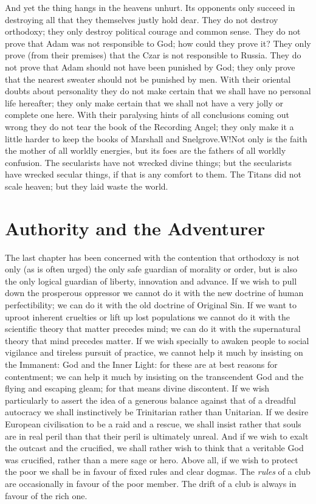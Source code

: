 \documentclass{book}
\begin{document}
And yet the thing hangs in the heavens unhurt. Its opponents only succeed in destroying all that they themselves justly hold dear. They do not destroy orthodoxy; they only destroy political courage and common sense. They do not prove that Adam was not responsible to God; how could they prove it? They only prove (from their premises) that the Czar is not responsible to Russia. They do not prove that Adam should not have been punished by God; they only prove that the nearest sweater should not be punished by men. With their oriental doubts about personality they do not make certain that we shall have no personal life hereafter; they only make certain that we shall not have a very jolly or complete one here. With their paralysing hints of all conclusions coming out wrong they do not tear the book of the Recording Angel; they only make it a little harder to keep the books of Marshall and Snelgrove.W!Not only is the faith the mother of all worldly energies, but its foes are the fathers of all worldly confusion. The secularists have not wrecked divine things; but the secularists have wrecked secular things, if that is any comfort to them. The Titans did not scale heaven; but they laid waste the world.

\chapter{Authority and the Adventurer}
\label{chapter-8}
The last chapter has been concerned with the contention that orthodoxy is not only (as is often urged) the only safe guardian of morality or order, but is also the only logical guardian of liberty, innovation and advance. If we wish to pull down the prosperous oppressor we cannot do it with the new doctrine of human perfectibility; we can do it with the old doctrine of Original Sin. If we want to uproot inherent cruelties or lift up lost populations we cannot do it with the scientific theory that matter precedes mind; we can do it with the supernatural theory that mind precedes matter. If we wish specially to awaken people to social vigilance and tireless pursuit of practice, we cannot help it much by insisting on the Immanent: God and the Inner Light: for these are at best reasons for contentment; we can help it much by insisting on the transcendent God and the flying and escaping gleam; for that means divine discontent. If we wish particularly to assert the idea of a generous balance against that of a dreadful autocracy we shall instinctively be Trinitarian rather than Unitarian. If we desire European civilisation to be a raid and a rescue, we shall insist rather that souls are in real peril than that their peril is ultimately unreal. And if we wish to exalt the outcast and the crucified, we shall rather wish to think that a veritable God was crucified, rather than a mere sage or hero. Above all, if we wish to protect the poor we shall be in favour of fixed rules and clear dogmas. The \emph{rules} of a club are occasionally in favour of the poor member. The drift of a club is always in favour of the rich one.
\end{document}
